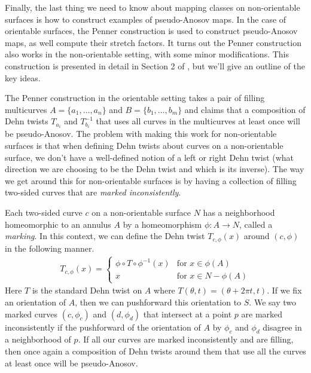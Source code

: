 Finally, the last thing we need to know about mapping classes on non-orientable surfaces is how to
construct examples of pseudo-Anosov maps. In the case of orientable surfaces, the Penner
construction is used to construct pseudo-Anosov maps, as well compute their stretch factors. It
turns out the Penner construction also works in the non-orientable setting, with some minor
modifications. This construction is presented in detail in Section 2 of \cite{Strenner_2017}, but
we'll give an outline of the key ideas.

The Penner construction in the orientable setting takes a pair of filling multicurves
$A = \{a_1,\dots,a_n\}$ and $B = \{b_1,\dots,b_m\}$ and claims that a composition of Dehn twists
$T_{a_i}$ and $T_{b_i}^{-1}$ that uses all curves in the multicurves at least once will be
pseudo-Anosov. The problem with making this work for non-orientable surfaces is that when defining
Dehn twists about curves on a non-orientable surface, we don't have a well-defined notion of a left
or right Dehn twist (what direction we are choosing to be the Dehn twist and which is its
inverse). The way we get around this for non-orientable surfaces is by having a collection of
filling two-sided curves that are \textit{marked inconsistently}.

Each two-sided curve $c$ on a non-orientable surface $N$ has a neighborhood homeomorphic to an
annulus $A$ by a homeomorphism $\phi: A \xrightarrow{} N$, called a \textit{marking}. In this
context, we can define the Dehn twist $T_{c,\phi}(x)$ around $(c,\phi)$ in the following manner.
\begin{align*}
  T_{c,\phi}(x) =
  \begin{cases}
    \phi \circ T \circ \phi^{-1}(x) & \text{for } x \in \phi(A) \\
    x & \text{for } x \in N - \phi(A)
  \end{cases}
\end{align*}
Here $T$ is the standard Dehn twist on $A$ where $T(\theta,t) = (\theta + 2\pi t,t)$. If we fix an
orientation of $A$, then we can pushforward this orientation to $S$. We say two marked curves
$(c,\phi_c)$ and $(d,\phi_d)$ that intersect at a point $p$ are marked inconsistently if the
pushforward of the orientation of $A$ by $\phi_c$ and $\phi_d$ disagree in a neighborhood of $p$.
If all our curves are marked inconsistently and are filling, then once again a composition of Dehn
twists around them that use all the curves at least once will be pseudo-Anosov.

